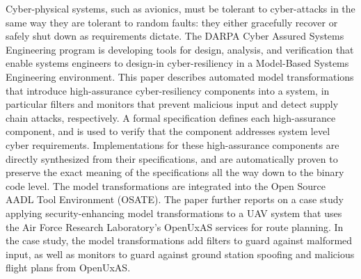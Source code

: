 Cyber-physical systems, such as avionics, must be tolerant to cyber-attacks in the same way they are tolerant to random faults: they either gracefully recover or safely shut down as requirements dictate.
The DARPA Cyber Assured Systems Engineering program is developing tools for design, analysis, and verification that enable systems engineers to design-in cyber-resiliency in a Model-Based Systems Engineering environment.
This paper describes automated model transformations that introduce high-assurance cyber-resiliency components into a system, in particular filters and monitors that prevent malicious input and detect supply chain attacks, respectively.
A formal specification defines each high-assurance component, and is used to verify that the component addresses system level cyber requirements.
Implementations for these high-assurance components are directly synthesized from their specifications, and are automatically proven to preserve the exact meaning of the specifications all the way down to the binary code level.
The model transformations are integrated into the Open Source AADL Tool Environment (OSATE).
The paper further reports on a case study applying security-enhancing model transformations to a UAV system that uses the Air Force Research Laboratory's OpenUxAS services for route planning.
In the case study, the model transformations add filters to guard against malformed input, as well as monitors to guard against ground station spoofing and malicious flight plans from OpenUxAS.
